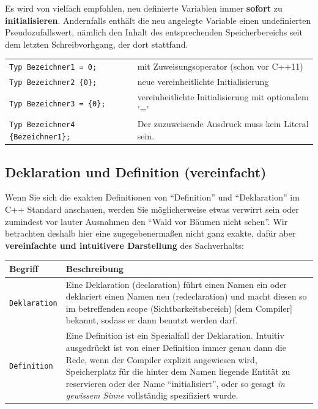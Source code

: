 \documentclass[a4paper]{report}
\begin{document}
Es wird von vielfach empfohlen, neu definierte Variablen immer \textbf{sofort} zu \textbf{initialisieren}. Andernfalls enthält die neu angelegte Variable einen undefinierten Pseudozufallswert, nämlich den Inhalt des entsprechenden Speicherbereichs seit dem letzten Schreibvorhgang, der dort stattfand.
\begin{center}
\begin{tabular}{|l|l|}
	\hline
	\texttt{Typ Bezeichner1 = 0;} & mit Zuweisungsoperator (schon vor C++11) \\
	\texttt{Typ Bezeichner2 \textrm{\{}0\textrm{\}};} & neue vereinheitlichte Initialisierung \\
	\texttt{Typ Bezeichner3 = \textrm{\{}0\textrm{\}};} & vereinheitlichte Initialisierung mit optionalem '=' \\
	\texttt{Typ Bezeichner4 \textrm{\{}Bezeichner1\textrm{\}};} & Der zuzuweisende Ausdruck muss kein Literal sein. \\
	\hline
\end{tabular}
\end{center}

\subsection{Deklaration und Definition (vereinfacht)}

Wenn Sie sich die exakten Definitionen von "`Definition"' und "`Deklaration"' im C++ Standard anschauen, werden Sie möglicherweise etwas verwirrt sein oder zumindest vor lauter Ausnahmen den "`Wald vor Bäumen nicht sehen"'. Wir betrachten deshalb hier eine zugegebenermaßen nicht ganz exakte, dafür aber \textbf{vereinfachte und intuitivere Darstellung} des Sachverhalts:

\begin{center}
\begin{tabular}{|p{3cm}|p{12cm}|}
	\hline
	\textbf{Begriff} & \textbf{Beschreibung} \\ \hline
	\texttt{Deklaration} & Eine Deklaration (declaration) führt einen Namen ein oder deklariert einen Namen neu (redeclaration) und macht diesen so im betreffenden scope (Sichtbarkeitsbereich) [dem Compiler] bekannt, sodass er dann benutzt werden darf. \\ \hline
	\texttt{Definition} & Eine Definition ist ein Spezialfall der Deklaration. Intuitiv ausgedrückt ist von einer Definition immer genau dann die Rede, wenn der Compiler explizit angewiesen wird, Speicherplatz für die hinter dem Namen liegende Entität zu reservieren oder der Name "`initialisiert"', oder so gesagt \textit{in gewissem Sinne} vollständig spezifiziert wurde. \\ \hline %
\end{tabular}
\end{center}
\end{document}
